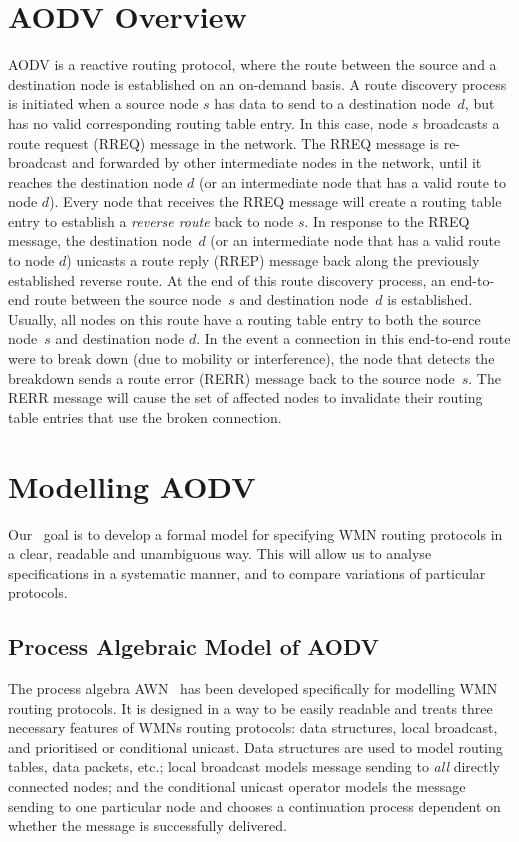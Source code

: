 \documentclass[conference,twoside]{IEEEtran}
\newcommand{\awn}{AWN\xspace}
\begin{document}
\section{AODV Overview}
\label{sec:AodvOverview}
AODV is a reactive routing protocol, where the route between the source  and a destination node is established on an on-demand basis. A route discovery process is initiated when a source node $s$ has data to send to a destination node~$d$, but has no valid corresponding routing table entry. In this case, node $s$ broadcasts a route request (RREQ) message in the network. The RREQ message is re-broadcast and forwarded by other intermediate nodes in the network, until it reaches the destination node $d$ (or an intermediate node that has a valid route to node $d$). Every node that receives the RREQ message will create a routing table entry to establish a \emph{reverse route} back to node $s$. In response to the RREQ message, the destination node~$d$ (or an intermediate node that has a valid route to node $d$) unicasts a route reply (RREP) message back along the previously established reverse route. At the end of this route discovery process, an end-to-end route between the source node~$s$ and destination node~$d$ is established. Usually, all nodes on this route have a routing table entry to both the source node~$s$ and destination node $d$. In the event a connection in this end-to-end route were to break down (due to mobility or interference), the node that detects the breakdown sends a route error (RERR) message back to the source node~$s$. The RERR message will cause the set of affected nodes to invalidate their routing table entries that use the broken connection.

\section{Modelling AODV}
Our \ goal is to develop a formal model for
specifying WMN routing protocols in a clear, readable and
unambiguous way. This will allow us to
analyse specifications in a systematic manner, and to compare
variations of particular protocols.

\subsection{Process Algebraic Model of AODV}\label{ssec:processalgebra}
The process algebra \awn~\cite{TR11}
has been developed specifically for modelling WMN routing protocols.\pagebreak{} It is designed in a way to be easily readable and
treats three necessary features of WMNs routing protocols:
 data structures, local broadcast, and prioritised or conditional unicast.
Data structures are used to model routing tables, data packets, etc.;
local broadcast models message sending to {\em all} directly
connected nodes; and the
conditional unicast operator models the
message sending
to one particular node and chooses a continuation process dependent on whether the
message is successfully delivered.
\end{document}

